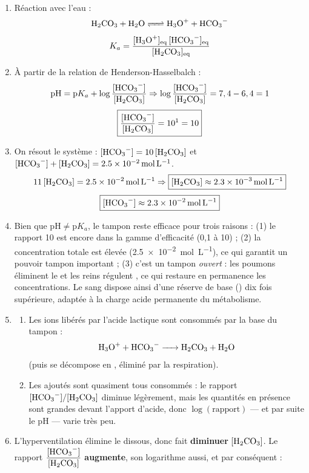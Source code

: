 \documentclass[11pt]{article}
\begin{document}
\begin{corrige}
\begin{enumerate}
  \item Réaction avec l'eau :
  \[ \ce{H2CO3 + H2O <=> H3O+ + HCO3-} \]
  \[
  K_a = \frac{[\ce{H3O+}]_{\text{eq}}\,[\ce{HCO3-}]_{\text{eq}}}{[\ce{H2CO3}]_{\text{eq}}}
  \]
  \item À partir de la relation de Henderson-Hasselbalch :
  \[
  \mathrm{pH} = \mathrm{p}K_a + \log\frac{[\ce{HCO3-}]}{[\ce{H2CO3}]}
  \Rightarrow \log\frac{[\ce{HCO3-}]}{[\ce{H2CO3}]} = 7,4 - 6,4 = 1
  \]
  \[
  \boxed{\frac{[\ce{HCO3-}]}{[\ce{H2CO3}]} = 10^{1} = 10}
  \]
  \item On résout le système : $[\ce{HCO3-}] = 10\,[\ce{H2CO3}]$ et $[\ce{HCO3-}] + [\ce{H2CO3}] = \SI{2,5e-2}{mol.L^{-1}}$.
  \[
  11\,[\ce{H2CO3}] = \SI{2,5e-2}{mol.L^{-1}} \Rightarrow \boxed{[\ce{H2CO3}] \approx \SI{2,3e-3}{mol.L^{-1}}}
  \]
  \[
  \boxed{[\ce{HCO3-}] \approx \SI{2,3e-2}{mol.L^{-1}}}
  \]
  \item Bien que $\mathrm{pH} \neq \mathrm{p}K_a$, le tampon reste efficace pour trois raisons : (1) le rapport 10 est encore dans la gamme d'efficacité (0,1 à 10) ; (2) la concentration totale est élevée (\SI{2,5e-2}{mol.L^{-1}}), ce qui garantit un pouvoir tampon important ; (3) c'est un tampon \emph{ouvert} : les poumons éliminent le  et les reins régulent , ce qui restaure en permanence les concentrations. Le sang dispose ainsi d'une réserve de base () dix fois supérieure, adaptée à la charge acide permanente du métabolisme.
  \item \begin{enumerate}
      \item Les ions  libérés par l'acide lactique sont consommés par la base du tampon :
      \[ \ce{H3O+ + HCO3- -> H2CO3 + H2O} \]
      (puis  se décompose en , éliminé par la respiration).
      \item Les  ajoutés sont quasiment tous consommés : le rapport $[\ce{HCO3-}]/[\ce{H2CO3}]$ diminue légèrement, mais les quantités en présence sont grandes devant l'apport d'acide, donc $\log(\text{rapport})$ — et par suite le pH — varie très peu.
    \end{enumerate}
  \item L'hyperventilation élimine le  dissous, donc fait \textbf{diminuer} $[\ce{H2CO3}]$. Le rapport $\dfrac{[\ce{HCO3-}]}{[\ce{H2CO3}]}$ \textbf{augmente}, son logarithme aussi, et par conséquent :

\end{enumerate}
\end{corrige}
\end{document}
